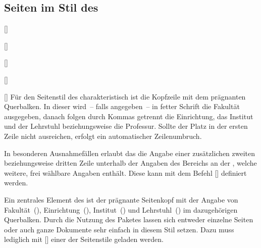 \begin{Declaration*}{}
\begin{Declaration*}{}
\begin{Declaration*}{}
\subsection{Seiten im Stil des \CDs}
%
%
%
\begin{Declaration}{[]}
\begin{Declaration}{[]}
\begin{Declaration}{[]}
\begin{Declaration}{[]}
\begin{Declaration}{[]}
\printdeclarationlist%
%
%
%
Für den Seitenstil des \TUDCDs charakteristisch ist die Kopfzeile mit dem 
prägnanten Querbalken. In dieser wird~-- falls angegeben~-- in fetter Schrift 
die Fakultät ausgegeben, danach folgen durch Kommas getrennt die Einrichtung, 
das Institut und der Lehrstuhl beziehungsweise die Professur. Sollte der Platz 
in der ersten Zeile nicht ausreichen, erfolgt ein automatischer Zeilenumbruch.

In besonderen Ausnahmefällen erlaubt das \CD die Angabe einer zusätzlichen
zweiten beziehungsweise dritten Zeile unterhalb der Angaben des Bereichs an der 
\TnUD, welche weitere, frei wählbare Angaben enthält. Diese kann mit dem Befehl 
[] definiert werden.
\end{Declaration}
\end{Declaration}
\end{Declaration}
\end{Declaration}
\end{Declaration}
%
\begin{Declaration}[v2.02]{}
\begin{Declaration}[v2.02]{}
\begin{Declaration}[v2.02]{}
\printdeclarationlist%
%
Ein zentrales Element des \TUDCDs ist der prägnante Seitenkopf mit der Angabe 
von Fakultät~(), Einrichtung~(), 
Institut~() und Lehrstuhl~() im dazugehörigen 
Querbalken. Durch die Nutzung des Paketes  lassen 
sich entweder einzelne Seiten oder auch ganze Dokumente sehr einfach in diesem 
Stil setzen. Dazu muss lediglich mit [] 
einer der Seitenstile geladen werden. 


\end{Declaration}
\end{Declaration}
\end{Declaration}
\end{Declaration*}
\end{Declaration*}
\end{Declaration*}
